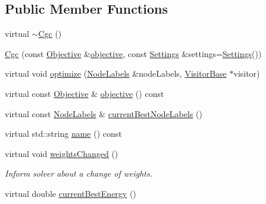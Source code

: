 \subsection*{Public Member Functions}
\begin{DoxyCompactItemize}
\item 
virtual \hyperlink{classnifty_1_1graph_1_1optimization_1_1multicut_1_1Cgc_a22509c2e989ab4f224a4caacfb54d6da}{$\sim$\+Cgc} ()
\item 
\hyperlink{classnifty_1_1graph_1_1optimization_1_1multicut_1_1Cgc_a4a28a63ad1ff1b29ffbc3bc5253e62e0}{Cgc} (const \hyperlink{classnifty_1_1graph_1_1optimization_1_1multicut_1_1Cgc_ac3e728f92d355814ff3b40b5f7d59123}{Objective} \&\hyperlink{classnifty_1_1graph_1_1optimization_1_1multicut_1_1Cgc_a926b85b4bfa4de48b4040b87f679a377}{objective}, const \hyperlink{structnifty_1_1graph_1_1optimization_1_1multicut_1_1Cgc_1_1Settings}{Settings} \&settings=\hyperlink{structnifty_1_1graph_1_1optimization_1_1multicut_1_1Cgc_1_1Settings}{Settings}())
\item 
virtual void \hyperlink{classnifty_1_1graph_1_1optimization_1_1multicut_1_1Cgc_a58eed5d8ecd30672dbb096ccdd7fd8c2}{optimize} (\hyperlink{classnifty_1_1graph_1_1optimization_1_1multicut_1_1Cgc_aec40bb34a73aeff370903e19e4c90ca0}{Node\+Labels} \&node\+Labels, \hyperlink{classnifty_1_1graph_1_1optimization_1_1multicut_1_1Cgc_afb4bc97ca8d80719f67fe59823ac9466}{Visitor\+Base} $\ast$visitor)
\item 
virtual const \hyperlink{classnifty_1_1graph_1_1optimization_1_1multicut_1_1Cgc_ac3e728f92d355814ff3b40b5f7d59123}{Objective} \& \hyperlink{classnifty_1_1graph_1_1optimization_1_1multicut_1_1Cgc_a926b85b4bfa4de48b4040b87f679a377}{objective} () const 
\item 
virtual const \hyperlink{classnifty_1_1graph_1_1optimization_1_1multicut_1_1Cgc_aec40bb34a73aeff370903e19e4c90ca0}{Node\+Labels} \& \hyperlink{classnifty_1_1graph_1_1optimization_1_1multicut_1_1Cgc_a973af9484141f8750ae72563a7128c4e}{current\+Best\+Node\+Labels} ()
\item 
virtual std\+::string \hyperlink{classnifty_1_1graph_1_1optimization_1_1multicut_1_1Cgc_ab54c4448bd816fbbc4a45c2dd8e9562d}{name} () const 
\item 
virtual void \hyperlink{classnifty_1_1graph_1_1optimization_1_1multicut_1_1Cgc_a45593f369b20f4a535bc79835f7d2541}{weights\+Changed} ()
\begin{DoxyCompactList}\small\item\em Inform solver about a change of weights. \end{DoxyCompactList}\item 
virtual double \hyperlink{classnifty_1_1graph_1_1optimization_1_1multicut_1_1Cgc_ad05e02649243b645e0c4e4a23d9835b1}{current\+Best\+Energy} ()
\end{DoxyCompactItemize}


